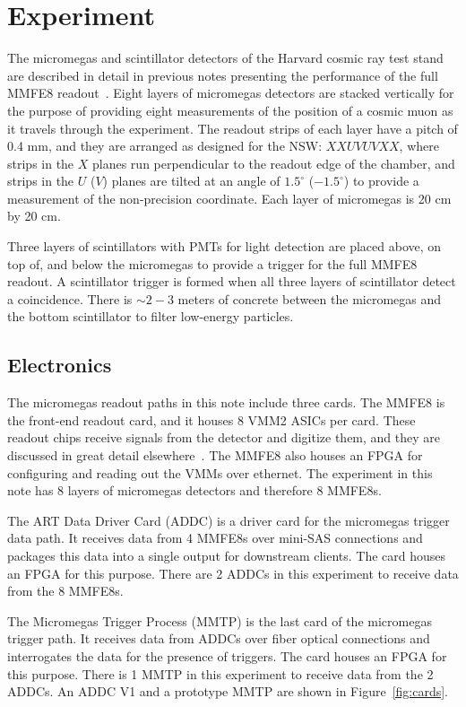 \section{Experiment}
\label{sec:exp}

The micromegas and scintillator detectors of the Harvard cosmic ray test stand are described in detail in previous notes presenting the performance of the full MMFE8 readout~\cite{noisy,noiseless}. Eight layers of micromegas detectors are stacked vertically for the purpose of providing eight measurements of the position of a cosmic muon as it travels through the experiment. The readout strips of each layer have a pitch of 0.4 mm, and they are arranged as designed for the NSW: $XXUVUVXX$, where strips in the $X$ planes run perpendicular to the readout edge of the chamber, and strips in the $U$ ($V$) planes are tilted at an angle of $1.5^\circ$ ($-1.5^\circ$) to provide a measurement of the non-precision coordinate. Each layer of micromegas is 20 cm by 20 cm.

Three layers of scintillators with PMTs for light detection are placed above, on top of, and below the micromegas to provide a trigger for the full MMFE8 readout. A scintillator trigger is formed when all three layers of scintillator detect a coincidence. There is $\sim\!2\!-\!3$ meters of concrete between the micromegas and the bottom scintillator to filter low-energy particles.

\subsection{Electronics}
\label{sec:exp-elx}

The micromegas readout paths in this note include three cards. The MMFE8 is the front-end readout card, and it houses 8 VMM2 ASICs per card. These readout chips receive signals from the detector and digitize them, and they are discussed in great detail elsewhere~\cite{nswtdr,noisy,noiseless}. The MMFE8 also houses an FPGA for configuring and reading out the VMMs over ethernet. The experiment in this note has 8 layers of micromegas detectors and therefore 8 MMFE8s.

The ART Data Driver Card (ADDC) is a driver card for the micromegas trigger data path. It receives data from 4 MMFE8s over mini-SAS connections and packages this data into a single output for downstream clients. The card houses an FPGA for this purpose. There are 2 ADDCs in this experiment to receive data from the 8 MMFE8s.

The Micromegas Trigger Process (MMTP) is the last card of the micromegas trigger path. It receives data from ADDCs over fiber optical connections and interrogates the data for the presence of triggers. The card houses an FPGA for this purpose. There is 1 MMTP in this experiment to receive data from the 2 ADDCs. An ADDC V1 and a prototype MMTP are shown in Figure~\ref{fig:cards}.

